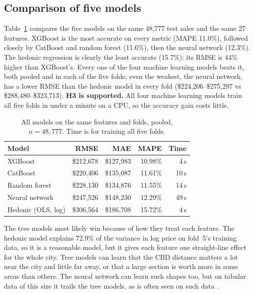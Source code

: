 \documentclass[conference]{IEEEtran}
\begin{document}
\subsection{Comparison of five models}\label{sec:res-models}
Table~\ref{tab:models} compares the five models on the same 48,777 test
sales and the same 27 features. XGBoost is the most accurate on every
metric (MAPE 11.0\%), followed closely by CatBoost and random forest
(11.6\%), then the neural network (12.3\%). The hedonic regression is
clearly the least accurate (15.7\%): its RMSE is 44\% higher than
XGBoost's. Every one of the four machine learning models beats it, both
pooled and in each of the five folds; even the weakest, the neural
network, has a lower RMSE than the hedonic model in every fold
(\$224,206--\$275,297 vs \$288,480--\$323,713). \textbf{H3 is supported.}
All four machine learning models train all five folds in under a minute
on a CPU, so the accuracy gain costs little.

\begin{table}[t]
  \centering
  \caption{All models on the same features and folds, pooled,
  $n=48{,}777$. Time is for training all five folds.}
  \label{tab:models}
  \begin{tabular}{@{}lrrrr@{}}
    \toprule
    Model & RMSE & MAE & MAPE & Time \\
    \midrule
    XGBoost             & \$212,678 & \$127,983 & 10.98\% & 4\,s \\
    CatBoost            & \$220,406 & \$135,087 & 11.61\% & 10\,s \\
    Random forest       & \$228,130 & \$134,876 & 11.55\% & 14\,s \\
    Neural network      & \$247,526 & \$148,230 & 12.29\% & 49\,s \\
    Hedonic (OLS, log)  & \$306,564 & \$186,708 & 15.72\% & 4\,s \\
    \bottomrule
  \end{tabular}
\end{table}

The tree models most likely win because of how they treat each feature.
The hedonic model explains 72.9\% of the variance in log price on
fold~5's training data, so it is a reasonable model, but it gives each
feature one straight-line effect for the whole city. Tree models can learn that the CBD distance matters a lot near the
city and little far away, or that a large section is worth more in some
areas than others. The neural network can learn such shapes too, but
on tabular data of this size it trails the tree models, as is often
seen on such data~\cite{grinsztajn2022}.
\end{document}
